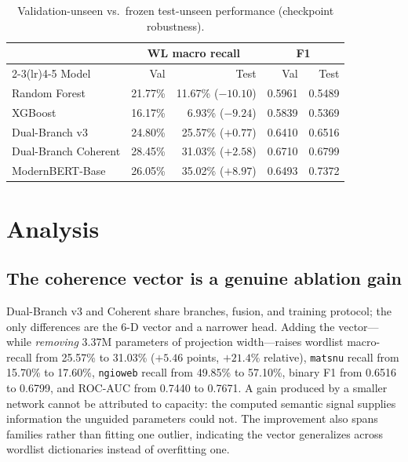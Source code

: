\documentclass[conference]{IEEEtran}
\begin{document}
\begin{table}[t]
\centering
\caption{Validation-unseen vs.\ frozen test-unseen performance (checkpoint robustness).}
\label{tab:valtest}
\footnotesize
\setlength{\tabcolsep}{3.5pt}
\begin{tabular}{@{}lrrrr@{}}
\toprule
& \multicolumn{2}{c}{WL macro recall} & \multicolumn{2}{c}{F1} \\
\cmidrule(lr){2-3}\cmidrule(lr){4-5}
Model & Val & Test & Val & Test \\
\midrule
Random Forest & 21.77\% & 11.67\% ($-10.10$) & 0.5961 & 0.5489 \\
XGBoost & 16.17\% & 6.93\% ($-9.24$) & 0.5839 & 0.5369 \\
Dual-Branch v3 & 24.80\% & 25.57\% ($+0.77$) & 0.6410 & 0.6516 \\
Dual-Branch Coherent & 28.45\% & 31.03\% ($+2.58$) & 0.6710 & 0.6799 \\
ModernBERT-Base & 26.05\% & 35.02\% ($+8.97$) & 0.6493 & 0.7372 \\
\bottomrule
\end{tabular}
\end{table}

\section{Analysis}
\subsection{The coherence vector is a genuine ablation gain}
Dual-Branch v3 and Coherent share branches, fusion, and training protocol; the only differences are the 6-D vector and a narrower head. Adding the vector---while \emph{removing} 3.37M parameters of projection width---raises wordlist macro-recall from 25.57\% to 31.03\% ($+5.46$ points, $+21.4\%$ relative), \texttt{matsnu} recall from 15.70\% to 17.60\%, \texttt{ngioweb} recall from 49.85\% to 57.10\%, binary F1 from 0.6516 to 0.6799, and ROC-AUC from 0.7440 to 0.7671. A gain produced by a smaller network cannot be attributed to capacity: the computed semantic signal supplies information the unguided parameters could not. The improvement also spans families rather than fitting one outlier, indicating the vector generalizes across wordlist dictionaries instead of overfitting one.
\end{document}
